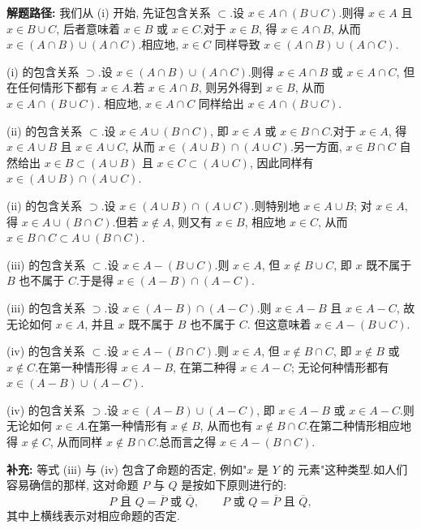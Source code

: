 \noindent\textbf{解题路径:} 我们从 (i) 开始, 先证包含关系 $\subset$.设
$x \in A \cap (B \cup C)$.则得 $x \in A$ 且 $x \in B \cup C$, 后者意味着
$x \in B$ 或 $x \in C$.对于 $x \in B$, 得 $x \in A \cap B$, 从而
$x \in (A \cap B) \cup (A \cap C)$.相应地, $x \in C$ 同样导致
$x \in (A \cap B) \cup (A \cap C)$.

(i) 的包含关系 $\supset$.设 $x \in (A \cap B) \cup (A \cap C)$.则得
$x \in A \cap B$ 或 $x \in A \cap C$, 但在任何情形下都有 $x \in A$.若
$x \in A \cap B$, 则另外得到 $x \in B$, 从而 $x \in A \cap (B \cup C)$.
相应地, $x \in A \cap C$ 同样给出 $x \in A \cap (B \cup C)$.

(ii) 的包含关系 $\subset$.设 $x \in A \cup (B \cap C)$, 即 $x \in A$ 或
$x \in B \cap C$.对于 $x \in A$, 得 $x \in A \cup B$ 且 $x \in A \cup C$,
从而 $x \in (A \cup B) \cap (A \cup C)$.另一方面, $x \in B \cap C$ 自然给出
$x \in B \subset (A \cup B)$ 且 $x \in C \subset (A \cup C)$, 因此同样有
$x \in (A \cup B) \cap (A \cup C)$.

(ii) 的包含关系 $\supset$.设 $x \in (A \cup B) \cap (A \cup C)$.则特别地
$x \in A \cup B$; 对 $x \in A$, 得 $x \in A \cup (B \cap C)$.但若 $x \notin A$,
则又有 $x \in B$, 相应地 $x \in C$, 从而 $x \in B \cap C \subset A \cup (B \cap C)$.

(iii) 的包含关系 $\subset$.设 $x \in A - (B \cup C)$.则 $x \in A$, 但
$x \notin B \cup C$, 即 $x$ 既不属于 $B$ 也不属于 $C$.于是得
$x \in (A - B) \cap (A - C)$.

(iii) 的包含关系 $\supset$.设 $x \in (A - B) \cap (A - C)$.则 $x \in A - B$
且 $x \in A - C$, 故无论如何 $x \in A$, 并且 $x$ 既不属于 $B$ 也不属于 $C$.
但这意味着 $x \in A - (B \cup C)$.

(iv) 的包含关系 $\subset$.设 $x \in A - (B \cap C)$.则 $x \in A$, 但
$x \notin B \cap C$, 即 $x \notin B$ 或 $x \notin C$.在第一种情形得
$x \in A - B$, 在第二种得 $x \in A - C$; 无论何种情形都有
$x \in (A - B) \cup (A - C)$.

(iv) 的包含关系 $\supset$.设 $x \in (A - B) \cup (A - C)$, 即 $x \in A - B$
或 $x \in A - C$.则无论如何 $x \in A$.在第一种情形有 $x \notin B$, 从而也有
$x \notin B \cap C$.在第二种情形相应地得 $x \notin C$, 从而同样
$x \notin B \cap C$.总而言之得 $x \in A - (B \cap C)$.

\noindent\textbf{补充:} 等式 (iii) 与 (iv) 包含了命题的否定, 例如"$x$ 是 $Y$ 的
元素"这种类型.如人们容易确信的那样, 这对命题 $P$ 与 $Q$ 是按如下原则进行的:
\[
\overline{P \text{ 且 } Q} = \overline{P} \text{ 或 } \overline{Q}, \qquad
\overline{P \text{ 或 } Q} = \overline{P} \text{ 且 } \overline{Q},
\]
其中上横线表示对相应命题的否定.

